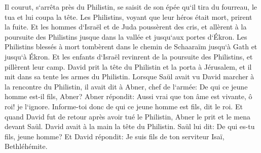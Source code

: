 \verse Il courut, s`arrêta près du Philistin, se saisit de son épée qu`il tira du fourreau, le tua et lui coupa la tête. Les Philistins, voyant que leur héros était mort, prirent la fuite. 
\verse Et les hommes d`Israël et de Juda poussèrent des cris, et allèrent à la poursuite des Philistins jusque dans la vallée et jusqu`aux portes d`Ékron. Les Philistins blessés à mort tombèrent dans le chemin de Schaaraïm jusqu`à Gath et jusqu`à Ékron. 
\verse Et les enfants d`Israël revinrent de la poursuite des Philistins, et pillèrent leur camp. 
\verse David prit la tête du Philistin et la porta à Jérusalem, et il mit dans sa tente les armes du Philistin. 
\verse Lorsque Saül avait vu David marcher à la rencontre du Philistin, il avait dit à Abner, chef de l`armée: De qui ce jeune homme est-il fils, Abner? Abner répondit: Aussi vrai que ton âme est vivante, ô roi! je l`ignore. 
\verse Informe-toi donc de qui ce jeune homme est fils, dit le roi. 
\verse Et quand David fut de retour après avoir tué le Philistin, Abner le prit et le mena devant Saül. David avait à la main la tête du Philistin. 
\verse Saül lui dit: De qui es-tu fils, jeune homme? Et David répondit: Je suis fils de ton serviteur Isaï, Bethléhémite. 

